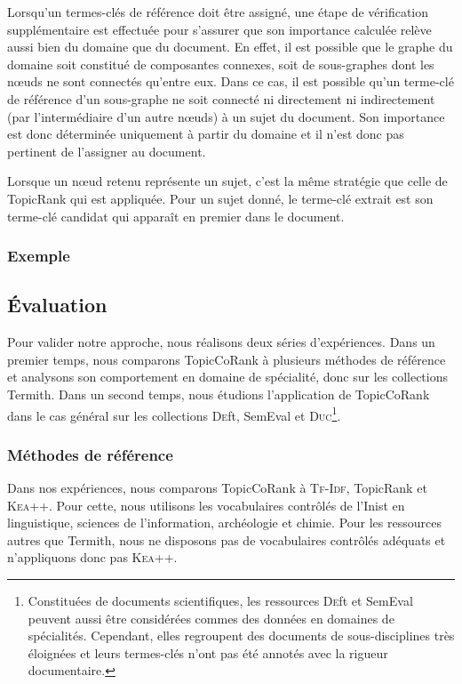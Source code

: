         Lorsqu'un termes-clés de référence doit être assigné, une étape de
        vérification supplémentaire est effectuée pour s'assurer que son
        importance calculée relève aussi bien du domaine que du document. En
        effet, il est possible que le graphe du domaine soit constitué de
        composantes connexes, soit de sous-graphes dont les n\oe{}uds ne sont
        connectés qu'entre eux. Dans ce cas, il est possible qu'un terme-clé de
        référence d'un sous-graphe ne soit connecté ni directement ni
        indirectement (par l'intermédiaire d'un autre n\oe{}uds) à un sujet du
        document. Son importance est donc déterminée uniquement à partir du
        domaine et il n'est donc pas pertinent de l'assigner au document.

        Lorsque un n\oe{}ud retenu représente un sujet, c'est la même stratégie
        que celle de TopicRank qui est appliquée. Pour un sujet donné, le
        terme-clé extrait est son terme-clé candidat qui apparaît en premier
        dans le document.

      \subsubsection{Exemple}
      \label{subsubsec:main-domain_specific_keyphrase_annotation-supervised_automatic_keyphrase_extraction-topiccorank-exemple}
        \TODO{\dots}

    \subsection{Évaluation}
    \label{subsec:main-domain_specific_keyphrase_annotation-supervised_automatic_keyphrase_annotation-evaluation}
      Pour valider notre approche, nous réalisons deux séries d'expériences.
      Dans un premier temps, nous comparons TopicCoRank à plusieurs méthodes de
      référence et analysons son comportement en domaine de spécialité, donc sur
      les collections Termith. Dans un second temps, nous étudions l'application
      de TopicCoRank dans le cas général sur les collections \textsc{De}ft,
      SemEval et \textsc{Duc}\footnote{Constituées de documents scientifiques,
      les ressources \textsc{De}ft et SemEval peuvent aussi être considérées
      commes des données en domaines de spécialités. Cependant, elles regroupent
      des documents de sous-disciplines très éloignées et leurs termes-clés
      n'ont pas été annotés avec la rigueur documentaire.}.

      \subsubsection{Méthodes de référence}
      \label{subsubsec:main-domain_specific_keyphrase_annotation-supervised_automatic_keyphrase_annotation-evaluation-baselines}
        Dans nos expériences, nous comparons TopicCoRank à \textsc{Tf-Idf},
        TopicRank et \textsc{Kea++}. Pour cette, nous utilisons les vocabulaires
        contrôlés de l'Inist en linguistique, sciences de l'information,
        archéologie et chimie. Pour les ressources autres que Termith, nous ne
        disposons pas de vocabulaires contrôlés adéquats et n'appliquons donc
        pas \textsc{Kea++}.


